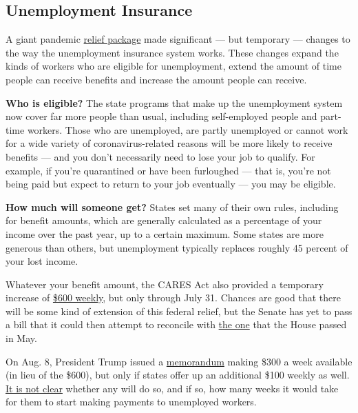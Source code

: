 \hypertarget{unemployment-insurance}{%
\subsection{Unemployment Insurance}\label{unemployment-insurance}}

A giant pandemic
\href{https://www.nytimes3xbfgragh.onion/2020/03/27/world/coronavirus-live-news-updates.html\#link-1900f91a}{relief
package} made significant --- but temporary --- changes to the way the
unemployment insurance system works. These changes expand the kinds of
workers who are eligible for unemployment, extend the amount of time
people can receive benefits and increase the amount people can receive.

\textbf{Who is eligible?} The state programs that make up the
unemployment system now cover far more people than usual, including
self-employed people and part-time workers. Those who are unemployed,
are partly unemployed or cannot work for a wide variety of
coronavirus-related reasons will be more likely to receive benefits ---
and you don't necessarily need to lose your job to qualify. For example,
if you're quarantined or have been furloughed --- that is, you're not
being paid but expect to return to your job eventually --- you may be
eligible.

\textbf{How much will someone get?} States set many of their own rules,
including for benefit amounts, which are generally calculated as a
percentage of your income over the past year, up to a certain maximum.
Some states are more generous than others, but unemployment typically
replaces roughly 45 percent of your lost income.

Whatever your benefit amount, the CARES Act also provided a temporary
increase of
\href{https://www.nytimes3xbfgragh.onion/interactive/2020/04/23/business/economy/unemployment-benefits-stimulus-coronavirus.html}{\$600
weekly}, but only through July 31. Chances are good that there will be
some kind of extension of this federal relief, but the Senate has yet to
pass a bill that it could then attempt to reconcile with
\href{https://www.nytimes3xbfgragh.onion/2020/05/15/us/politics/house-simulus-vote.html}{the
one} that the House passed in May.

On Aug. 8, President Trump issued a
\href{https://www.whitehouse.gov/presidential-actions/memorandum-authorizing-needs-assistance-program-major-disaster-declarations-related-coronavirus-disease-2019/}{memorandum}
making \$300 a week available (in lieu of the \$600), but only if states
offer up an additional \$100 weekly as well.
\href{https://www.nytimes3xbfgragh.onion/2020/08/09/business/trump-executive-orders-unemployment.html}{It
is not clear} whether any will do so, and if so, how many weeks it would
take for them to start making payments to unemployed workers.

